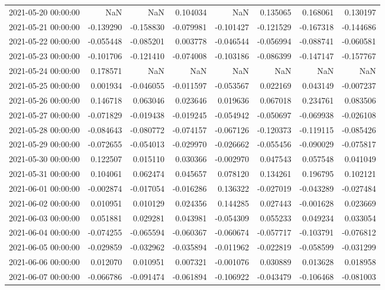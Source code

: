 \begin{tabular}{lrrrrrrr}
2021-05-20 00:00:00 & NaN & NaN & 0.104034 & NaN & 0.135065 & 0.168061 & 0.130197 \\
2021-05-21 00:00:00 & -0.139290 & -0.158830 & -0.079981 & -0.101427 & -0.121529 & -0.167318 & -0.144686 \\
2021-05-22 00:00:00 & -0.055448 & -0.085201 & 0.003778 & -0.046544 & -0.056994 & -0.088741 & -0.060581 \\
2021-05-23 00:00:00 & -0.101706 & -0.121410 & -0.074008 & -0.103186 & -0.086399 & -0.147147 & -0.157767 \\
2021-05-24 00:00:00 & 0.178571 & NaN & NaN & NaN & NaN & NaN & NaN \\
2021-05-25 00:00:00 & 0.001934 & -0.046055 & -0.011597 & -0.053567 & 0.022169 & 0.043149 & -0.007237 \\
2021-05-26 00:00:00 & 0.146718 & 0.063046 & 0.023646 & 0.019636 & 0.067018 & 0.234761 & 0.083506 \\
2021-05-27 00:00:00 & -0.071829 & -0.019438 & -0.019245 & -0.054942 & -0.050697 & -0.069938 & -0.026108 \\
2021-05-28 00:00:00 & -0.084643 & -0.080772 & -0.074157 & -0.067126 & -0.120373 & -0.119115 & -0.085426 \\
2021-05-29 00:00:00 & -0.072655 & -0.054013 & -0.029970 & -0.026662 & -0.055456 & -0.090029 & -0.075817 \\
2021-05-30 00:00:00 & 0.122507 & 0.015110 & 0.030366 & -0.002970 & 0.047543 & 0.057548 & 0.041049 \\
2021-05-31 00:00:00 & 0.104061 & 0.062474 & 0.045657 & 0.078120 & 0.134261 & 0.196795 & 0.102121 \\
2021-06-01 00:00:00 & -0.002874 & -0.017054 & -0.016286 & 0.136322 & -0.027019 & -0.043289 & -0.027484 \\
2021-06-02 00:00:00 & 0.010951 & 0.010129 & 0.024356 & 0.144285 & 0.027443 & -0.001628 & 0.023669 \\
2021-06-03 00:00:00 & 0.051881 & 0.029281 & 0.043981 & -0.054309 & 0.055233 & 0.049234 & 0.033054 \\
2021-06-04 00:00:00 & -0.074255 & -0.065594 & -0.060367 & -0.060674 & -0.057717 & -0.103791 & -0.076812 \\
2021-06-05 00:00:00 & -0.029859 & -0.032962 & -0.035894 & -0.011962 & -0.022819 & -0.058599 & -0.031299 \\
2021-06-06 00:00:00 & 0.012070 & 0.010951 & 0.007321 & -0.001076 & 0.030889 & 0.013628 & 0.018958 \\
2021-06-07 00:00:00 & -0.066786 & -0.091474 & -0.061894 & -0.106922 & -0.043479 & -0.106468 & -0.081003 \\

\end{tabular}
